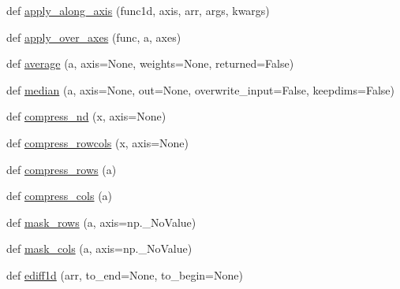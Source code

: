 \begin{DoxyCompactItemize}
\begin{DoxyCompactList}
 \end{DoxyCompactList}\item 
def \hyperlink{namespacenumpy_1_1ma_1_1extras_a47125a3978a9770c7ea259be7601906a}{apply\+\_\+along\+\_\+axis} (func1d, axis, arr, args, kwargs)
\item 
def \hyperlink{namespacenumpy_1_1ma_1_1extras_a6e0f3fbd420a80320f777c9ee490b735}{apply\+\_\+over\+\_\+axes} (func, a, axes)
\item 
def \hyperlink{namespacenumpy_1_1ma_1_1extras_afa1327549541fe5860453f7ec7bdef86}{average} (a, axis=None, weights=None, returned=False)
\item 
def \hyperlink{namespacenumpy_1_1ma_1_1extras_a3ef80454d56e9d5af85f4d566743f801}{median} (a, axis=None, out=None, overwrite\+\_\+input=False, keepdims=False)
\item 
def \hyperlink{namespacenumpy_1_1ma_1_1extras_a15ecd62cd3beca94f2e974619669ab58}{compress\+\_\+nd} (x, axis=None)
\item 
def \hyperlink{namespacenumpy_1_1ma_1_1extras_a3e2b6486aefeb320bba95ad627d677dc}{compress\+\_\+rowcols} (x, axis=None)
\item 
def \hyperlink{namespacenumpy_1_1ma_1_1extras_a61282f81d609b69bc6012d36ac1d1e4f}{compress\+\_\+rows} (a)
\item 
def \hyperlink{namespacenumpy_1_1ma_1_1extras_a662462674966ffecadfae444a019ac5f}{compress\+\_\+cols} (a)
\item 
def \hyperlink{namespacenumpy_1_1ma_1_1extras_a01c3a574c0e43d85ba78e61c7c6e8d64}{mask\+\_\+rows} (a, axis=np.\+\_\+\+No\+Value)
\item 
def \hyperlink{namespacenumpy_1_1ma_1_1extras_a853d98855786af0c3b220a467e05c75d}{mask\+\_\+cols} (a, axis=np.\+\_\+\+No\+Value)
\item 
def \hyperlink{namespacenumpy_1_1ma_1_1extras_a728a9d0dfe14a3ee87cbe74b73ac8983}{ediff1d} (arr, to\+\_\+end=None, to\+\_\+begin=None)
\begin{DoxyCompactList}\small\item\em 


\end{DoxyCompactList}
\end{DoxyCompactItemize}

